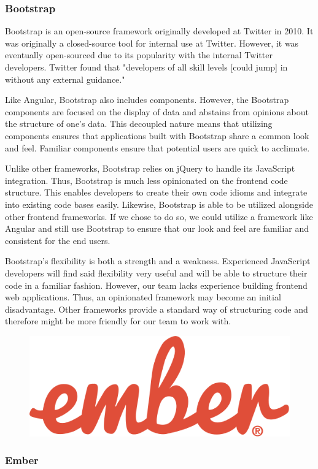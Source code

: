 \documentclass[12pt]{report}
\begin{document}
\begin{enumerate}
\subsubsection*{Bootstrap}

Bootstrap is an open-source framework originally developed at Twitter in 2010.\cite{bootstrapabout} It was originally a closed-source tool for internal use at Twitter. However, it was eventually open-sourced due to its popularity with the internal Twitter developers. Twitter found that "developers of all skill levels [could jump] in without any external guidance."\cite{bootstrapabout}

Like Angular, Bootstrap also includes components. However, the Bootstrap components are focused on the display of data and abstains from opinions about the structure of one's data. This decoupled nature means that utilizing components ensures that applications built with Bootstrap share a common look and feel. Familiar components ensure that potential users are quick to acclimate.

Unlike other frameworks, Bootstrap relies on jQuery to handle its JavaScript integration.\cite{bootstrapjs} Thus, Bootstrap is much less opinionated on the frontend code structure. This enables developers to create their own code idioms and integrate into existing code bases easily. Likewise, Bootstrap is able to be utilized alongside other frontend frameworks. If we chose to do so, we could utilize a framework like Angular and still use Bootstrap to ensure that our look and feel are familiar and consistent for the end users.

Bootstrap's flexibility is both a strength and a weakness. Experienced JavaScript developers will find said flexibility very useful and will be able to structure their code in a familiar fashion. However, our team lacks experience building frontend web applications. Thus, an opinionated framework may become an initial disadvantage. Other frameworks provide a standard way of structuring code and therefore might be more friendly for our team to work with.

\begin{figure}[h]
	\centering
	\includegraphics[width=0.25\linewidth]{ember}
\end{figure}

\subsubsection*{Ember}


\end{enumerate}
\end{document}
